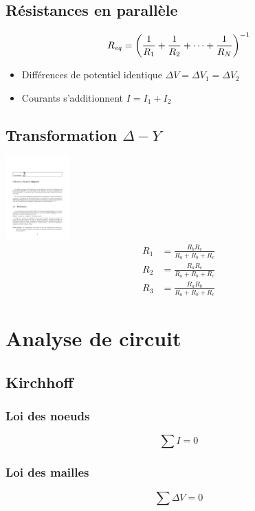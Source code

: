 \subsection{Résistances en parallèle}
\begin{equation*}
    R_{\mathit{eq}}=\qty(\frac{1}{R_1}+\frac{1}{R_2}+\dots +\frac{1}{R_N})^{-1}
\end{equation*}
\begin{itemize}[nosep]
    \item Différences de potentiel identique \( \Delta V = \Delta V_1 =\Delta V_2 \)
    \item Courants s'additionnent \( I = I_1 + I_2\)
\end{itemize}

\subsection{Transformation $\Delta-Y$}
\centering
\includegraphics[trim={2in 7.5in 2in 1.25in}, clip=true,page=15,height=1.25in]{fig/note2.pdf}
\begin{align*}
    R_1 &= \frac{R_b R_c}{R_a + R_b + R_c}\\
    R_2 &= \frac{R_a R_c}{R_a + R_b + R_c}\\
    R_3 &= \frac{R_a R_b}{R_a + R_b + R_c}
\end{align*}
\raggedright

\section{Analyse de circuit}
\subsection{Kirchhoff}
\begin{multicols*}{2}
\subsubsection{Loi des noeuds}
\begin{equation*}
    \sum I = 0
\end{equation*}
    
\subsubsection{Loi des mailles}
\begin{equation*}
    \sum \Delta V =0
\end{equation*}
\end{multicols*}

